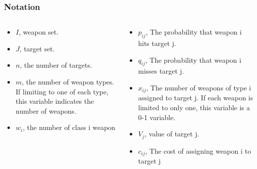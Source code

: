 \documentclass[CJK,10pt]{beamer}
\begin{document}
\begin{frame}
    \frametitle{Notation}
    \begin{columns}
        \begin{column}{.50\linewidth}
            \footnotesize
            \begin{itemize}
                \item $I$, weapon set.
                \item $J$, target set.
                \item $n$, the number of targets.
                \item $m$, the number of weapon types. If limiting to one of each type, this variable indicates the number of weapons.
                \item $w_i$, the number of class i weapon
            \end{itemize}
        \end{column}
        \begin{column}{.50\linewidth}
            \footnotesize
            \begin{itemize}
                \item $p_{ij}$, The probability that weapon i hits target j.
                \item $q_{ij}$, The probability that weapon i misses target j.
                \item $x_{ij}$, The number of weapons of type i assigned to target j. If each weapon is limited to only one, this variable is a 0-1 variable.
                \item $V_j$, value of target j.
                \item $c_{ij}$, The cost of assigning weapon i to target j
            \end{itemize}
        \end{column}
    \end{columns}
\end{frame}
\end{document}

